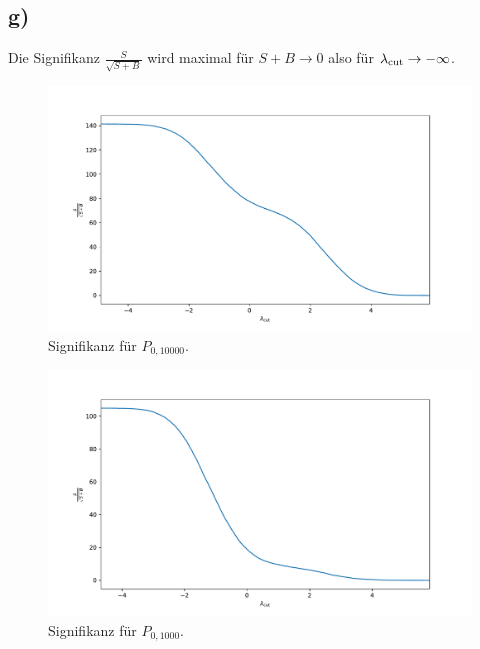 \documentclass[a4paper, 11pt]{article}
\begin{document}
\subsection*{g)}
Die Signifikanz $\frac{S}{\sqrt{S + B}}$ wird maximal für $S + B \rightarrow 0$ also für $\lambda_\textup{cut} \rightarrow -\infty$.
\begin{figure}
    \centering
    \includegraphics[width=\textwidth]{../A16/A16g_10000.pdf}
    \caption{Signifikanz für $P_{0, 10000}$.}
    \label{fig:A16g_10000}
\end{figure}
\begin{figure}
    \centering
    \includegraphics[width=\textwidth]{../A16/A16g_1000.pdf}
    \caption{Signifikanz für $P_{0, 1000}$.}
    \label{fig:A16g_1000}
\end{figure}
\FloatBarrier


\end{document}
